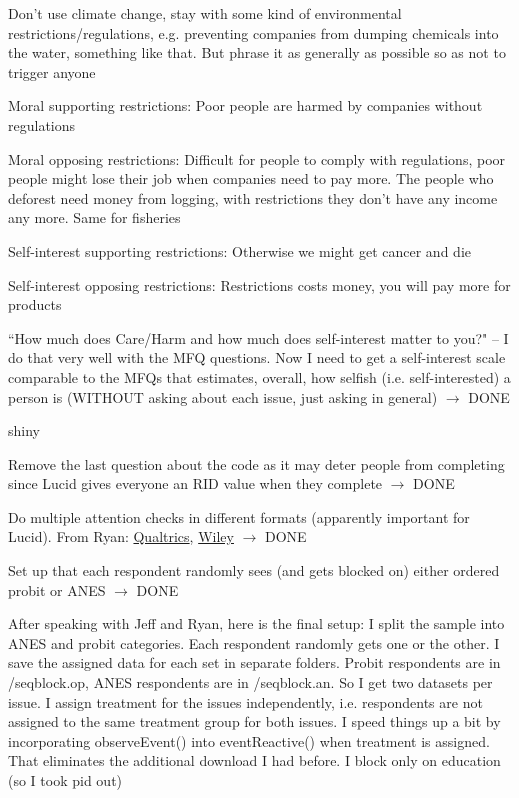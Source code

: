 \documentclass[12pt]{article}
\begin{document}
\begin{coi}
\begin{coi}
\begin{coi}
						\item Don't use climate change, stay with some kind of environmental restrictions/regulations, e.g. preventing companies from dumping chemicals into the water, something like that. But phrase it as generally as possible so as not to trigger anyone
						\item Moral supporting restrictions: Poor people are harmed by companies without regulations
						\item Moral opposing restrictions: Difficult for people to comply with regulations, poor people might lose their job when companies need to pay more. The people who deforest need money from logging, with restrictions they don't have any income any more. Same for fisheries
						\item Self-interest supporting restrictions: Otherwise we might get cancer and die
						\item Self-interest opposing restrictions: Restrictions costs money, you will pay more for products
					\end{coi}
				\item ``How much does Care/Harm and how much does self-interest matter to you?" -- I do that very well with the MFQ questions. Now I need to get a self-interest scale comparable to the MFQs that estimates, overall, how selfish (i.e. self-interested) a person is (WITHOUT asking about each issue, just asking in general) $\rightarrow$ DONE
				\item shiny
					\begin{coi}
						\item Remove the last question about the code as it may deter people from completing since Lucid gives everyone an RID value when they complete $\rightarrow$ DONE
						\item Do multiple attention checks in different formats (apparently important for Lucid). From Ryan: \href{https://www.qualtrics.com/blog/using-attention-checks-in-your-surveys-may-harm-data-quality/}{Qualtrics}, \href{https://onlinelibrary.wiley.com/doi/10.1111/ajps.12396}{Wiley} $\rightarrow$ DONE
						\item Set up that each respondent randomly sees (and gets blocked on) either ordered probit or ANES $\rightarrow$ DONE
						\item After speaking with Jeff and Ryan, here is the final setup: I split the sample into ANES and probit categories. Each respondent randomly gets one or the other. I save the assigned data for each set in separate folders. Probit respondents are in /seqblock.op, ANES respondents are in /seqblock.an. So I get two datasets per issue. I assign treatment for the issues independently, i.e. respondents are not assigned to the same treatment group for both issues. I speed things up a bit by incorporating observeEvent() into eventReactive() when treatment is assigned. That eliminates the additional download I had before. I block only on education (so I took pid out)

\end{coi}
\end{coi}
\end{coi}
\end{document}
